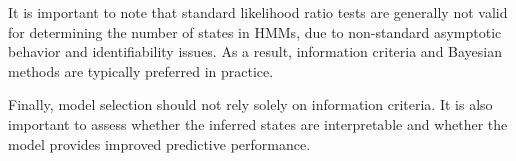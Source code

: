 \documentclass[11pt]{article}
\begin{document}
It is important to note that standard likelihood ratio tests are generally not valid for determining the number of states in HMMs, due to non-standard asymptotic behavior and identifiability issues. As a result, information criteria and Bayesian methods are typically preferred in practice.

Finally, model selection should not rely solely on information criteria. It is also important to assess whether the inferred states are interpretable and whether the model provides improved predictive performance.
\pagebreak

\end{document}
